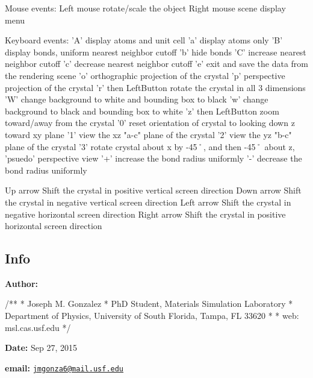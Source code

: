 \begin{DoxyVerb}    Mouse events:
      Left mouse            rotate/scale the object
      Right mouse           scene display menu
  
    Keyboard events:
        'A'                   display atoms and unit cell
        'a'                   display atoms only
        'B'                   display bonds, uniform nearest neighbor cutoff
        'b'                   hide bonds
        'C'                   increase nearest neighbor cutoff
        'c'                   decrease nearest neighbor cutoff
        'e'                   exit and save the data from the rendering scene
        'o'                   orthographic projection of the crystal
        'p'                   perspective projection of the crystal
        'r' then LeftButton   rotate the crystal in all 3 dimensions
        'W'                   change background to white and bounding box to black
        'w'                   change background to black and bounding box to white
        'z' then LeftButton   zoom toward/away from the crystal
        '0'                   reset orientation of crystal to looking down z toward xy plane
        '1'                   view the xz "a-c" plane of the crystal
        '2'                   view the yz "b-c" plane of the crystal
        '3'                   rotate crystal about x by -45˚, and then -45˚ about z, 'psuedo' perspective view
        '+'                   increase the bond radius uniformly
        '-'                   decrease the bond radius uniformly
   
        Up arrow              Shift the crystal in positive vertical screen direction
        Down arrow            Shift the crystal in negative vertical screen direction
        Left arrow            Shift the crystal in negative horizontal screen direction
        Right arrow           Shift the crystal in positive horizontal screen direction
\end{DoxyVerb}
 



\subsection*{Info }

{\bfseries Author\+:} \begin{DoxyVerb}/**
  * Joseph M. Gonzalez
  * PhD Student, Materials Simulation Laboratory
  * Department of Physics, University of South Florida, Tampa, FL 33620
  *
  * web: msl.cas.usf.edu
  */
\end{DoxyVerb}


{\bfseries Date\+:} Sep 27, 2015

{\bfseries email\+:} \href{mailto:jmgonza6@mail.usf.edu}{\tt jmgonza6@mail.\+usf.\+edu} 
